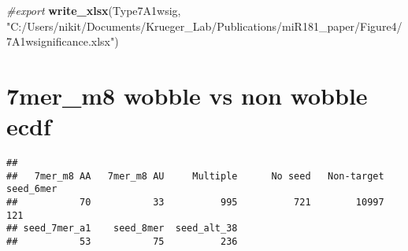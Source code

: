 \documentclass[
]{article}
\newenvironment{Shaded}{\begin{snugshade}}{\end{snugshade}}
\newcommand{\CommentTok}[1]{\textcolor[rgb]{0.56,0.35,0.01}{\textit{#1}}}
\newcommand{\FunctionTok}[1]{\textcolor[rgb]{0.13,0.29,0.53}{\textbf{#1}}}
\newcommand{\NormalTok}[1]{#1}
\newcommand{\OtherTok}[1]{\textcolor[rgb]{0.56,0.35,0.01}{#1}}
\newcommand{\SpecialCharTok}[1]{\textcolor[rgb]{0.81,0.36,0.00}{\textbf{#1}}}
\newcommand{\StringTok}[1]{\textcolor[rgb]{0.31,0.60,0.02}{#1}}
\begin{document}
\begin{Shaded}
\begin{Highlighting}[]
\CommentTok{\#export}
\FunctionTok{write\_xlsx}\NormalTok{(Type7A1wsig, }\StringTok{"C:/Users/nikit/Documents/Krueger\_Lab/Publications/miR181\_paper/Figure4/7A1wsignificance.xlsx"}\NormalTok{)}
\end{Highlighting}
\end{Shaded}

\hypertarget{mer_m8-wobble-vs-non-wobble-ecdf}{%
\section{7mer\_m8 wobble vs non wobble
ecdf}\label{mer_m8-wobble-vs-non-wobble-ecdf}}

\begin{Shaded}
\end{Shaded}

\begin{verbatim}
## 
##   7mer_m8 AA   7mer_m8 AU     Multiple      No seed   Non-target    seed_6mer 
##           70           33          995          721        10997          121 
## seed_7mer_a1    seed_8mer  seed_alt_38 
##           53           75          236
\end{verbatim}
\end{document}
